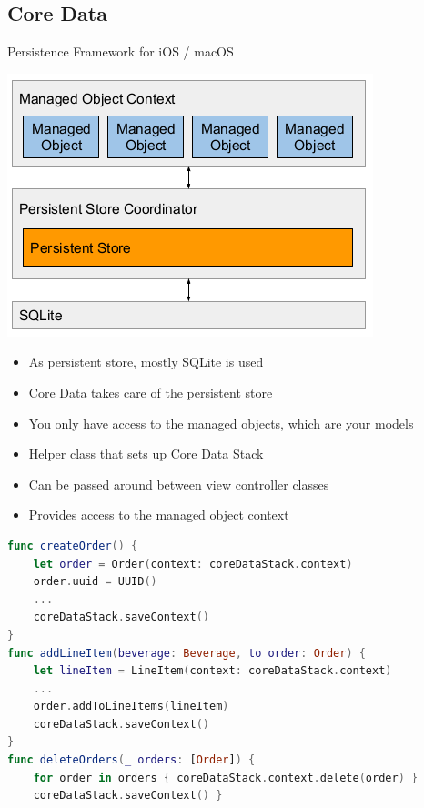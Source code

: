 \columnbreak
\subsection{Core Data}

\begin{breakbox}

Persistence Framework for iOS / macOS

\includegraphics[width=.12\textwidth]{figures/coreData.png}

\begin{itemize}
\tightlist
\item
  As persistent store, mostly SQLite is used
\item
  Core Data takes care of the persistent store
\item
  You only have access to the managed objects, which are your models
\end{itemize}
\end{breakbox}
\begin{breakbox}

\begin{itemize}
\tightlist
\item
  Helper class that sets up Core Data Stack
\item
  Can be passed around between view controller classes
\item
  Provides access to the managed object context
\end{itemize}

\begin{lstlisting}[language=swift]
func createOrder() {
    let order = Order(context: coreDataStack.context)
    order.uuid = UUID()
    ...
    coreDataStack.saveContext()
}
func addLineItem(beverage: Beverage, to order: Order) {
    let lineItem = LineItem(context: coreDataStack.context)
    ...
    order.addToLineItems(lineItem)
    coreDataStack.saveContext() 
}
func deleteOrders(_ orders: [Order]) {
    for order in orders { coreDataStack.context.delete(order) }
    coreDataStack.saveContext() }
\end{lstlisting}
\end{breakbox}

